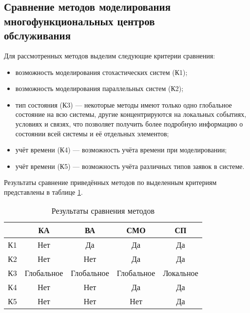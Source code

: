 \subsection[Сравнение методов моделирования\\многофункциональных центров обслуживания]{Сравнение методов моделирования\\многофункциональных центров\\обслуживания}

Для рассмотренных методов выделим следующие критерии сравнения:
\begin{itemize}[label=---]
	\item возможность моделирования стохастических систем (К1);
	\item возможность моделирования параллельных систем (К2);
	\item тип состояния (К3) --- некоторые методы имеют только одно глобальное состояние на всю системы, другие концентрируются на локальных событиях, условиях и связях, что позволяет получить более подробную информацию о состоянии всей системы и её отдельных элементов;
	\item учёт времени (К4) --- возможность учёта времени при моделировании;
	\item учёт времени (К5) --- возможность учёта различных типов заявок в системе.
\end{itemize}

Результаты сравнение приведённых методов по выделенным критериям представлены в таблице \ref{tbl:cmp}.

\begin{table}[!ht]
	\begin{center}
		\begin{threeparttable}
			\captionsetup{justification=raggedright,singlelinecheck=off}
			\caption{Результаты сравнения  методов}
			\label{tbl:cmp}
			\begin{tabular}{|l|c|c|c|c|}
				\hline
				\makecell[c]{Критерий} & КА & ВА & СМО & СП \\\hline
				К1	& Нет & Да &	Да & Да \\\hline
				К2 & Нет & Нет & Да & Да \\\hline
				К3 & Глобальное & Глобальное & Глобальное &	Локальное \\\hline
				К4 & Нет & Нет & Да & Да \\\hline
				К5 & Нет & Нет & Нет & Да \\\hline
			\end{tabular}
		\end{threeparttable}
	\end{center}
\end{table}


